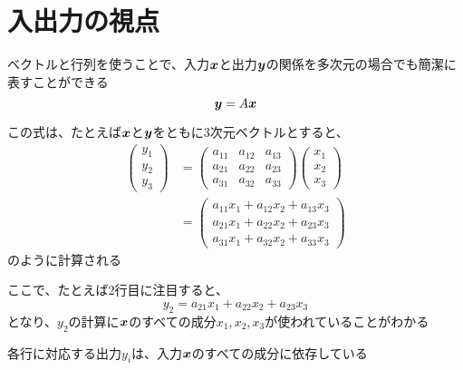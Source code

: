\documentclass[../../../topic_linear-algebra]{subfiles}
\begin{document}
\sectionline
\section{入出力の視点}

ベクトルと行列を使うことで、入力$\vb*{x}$と出力$\vb*{y}$の関係を多次元の場合でも簡潔に表すことができる
\begin{equation*}
  \vb*{y} = A \vb*{x}
\end{equation*}

この式は、たとえば$\vb*{x}$と$\vb*{y}$をともに3次元ベクトルとすると、
\begin{align*}
  \begin{pmatrix}
    y_1 \\
    y_2 \\
    y_3
  \end{pmatrix} & = \begin{pmatrix}
                      a_{11} & a_{12} & a_{13} \\
                      a_{21} & a_{22} & a_{23} \\
                      a_{31} & a_{32} & a_{33}
                    \end{pmatrix}
  \begin{pmatrix}
    x_1 \\
    x_2 \\
    x_3
  \end{pmatrix}                                        \\
                  & = \begin{pmatrix}
                        a_{11}x_1 + a_{12}x_2 + a_{13}x_3 \\
                        a_{21}x_1 + a_{22}x_2 + a_{23}x_3 \\
                        a_{31}x_1 + a_{32}x_2 + a_{33}x_3
                      \end{pmatrix}
\end{align*}
のように計算される

\br

ここで、たとえば2行目に注目すると、
\begin{equation*}
  y_2 = a_{21}x_1 + a_{22}x_2 + a_{23}x_3
\end{equation*}
となり、$y_2$の計算に$\vb*{x}$のすべての成分$x_1, x_2, x_3$が使われていることがわかる

\br

\begin{shaded}
  各行に対応する出力$y_i$は、入力$\vb*{x}$のすべての成分に依存している
\end{shaded}
\end{document}
